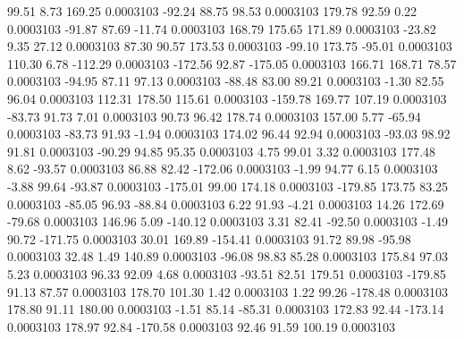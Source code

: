        99.51        8.73      169.25     0.0003103
      -92.24       88.75       98.53     0.0003103
      179.78       92.59        0.22     0.0003103
      -91.87       87.69      -11.74     0.0003103
      168.79      175.65      171.89     0.0003103
      -23.82        9.35       27.12     0.0003103
       87.30       90.57      173.53     0.0003103
      -99.10      173.75      -95.01     0.0003103
      110.30        6.78     -112.29     0.0003103
     -172.56       92.87     -175.05     0.0003103
      166.71      168.71       78.57     0.0003103
      -94.95       87.11       97.13     0.0003103
      -88.48       83.00       89.21     0.0003103
       -1.30       82.55       96.04     0.0003103
      112.31      178.50      115.61     0.0003103
     -159.78      169.77      107.19     0.0003103
      -83.73       91.73        7.01     0.0003103
       90.73       96.42      178.74     0.0003103
      157.00        5.77      -65.94     0.0003103
      -83.73       91.93       -1.94     0.0003103
      174.02       96.44       92.94     0.0003103
      -93.03       98.92       91.81     0.0003103
      -90.29       94.85       95.35     0.0003103
        4.75       99.01        3.32     0.0003103
      177.48        8.62      -93.57     0.0003103
       86.88       82.42     -172.06     0.0003103
       -1.99       94.77        6.15     0.0003103
       -3.88       99.64      -93.87     0.0003103
     -175.01       99.00      174.18     0.0003103
     -179.85      173.75       83.25     0.0003103
      -85.05       96.93      -88.84     0.0003103
        6.22       91.93       -4.21     0.0003103
       14.26      172.69      -79.68     0.0003103
      146.96        5.09     -140.12     0.0003103
        3.31       82.41      -92.50     0.0003103
       -1.49       90.72     -171.75     0.0003103
       30.01      169.89     -154.41     0.0003103
       91.72       89.98      -95.98     0.0003103
       32.48        1.49      140.89     0.0003103
      -96.08       98.83       85.28     0.0003103
      175.84       97.03        5.23     0.0003103
       96.33       92.09        4.68     0.0003103
      -93.51       82.51      179.51     0.0003103
     -179.85       91.13       87.57     0.0003103
      178.70      101.30        1.42     0.0003103
        1.22       99.26     -178.48     0.0003103
      178.80       91.11      180.00     0.0003103
       -1.51       85.14      -85.31     0.0003103
      172.83       92.44     -173.14     0.0003103
      178.97       92.84     -170.58     0.0003103
       92.46       91.59      100.19     0.0003103
